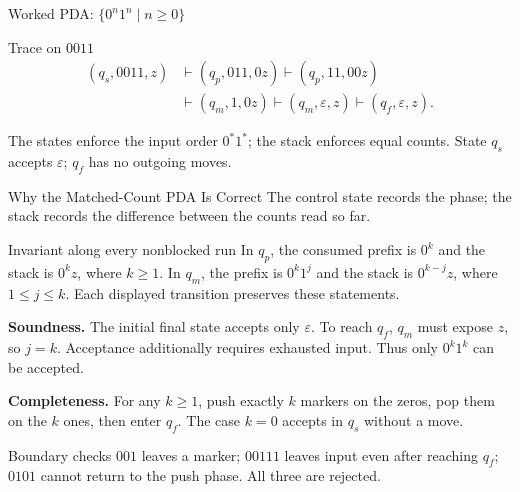 \documentclass[10pt]{beamer}
\begin{document}
\begin{frame}{Worked PDA: $\{0^n1^n\mid n\ge0\}$}
  \begin{center}
  \end{center}
  \pause
  \begin{exampleblock}{Trace on $0011$}
    \[
    \begin{aligned}
      (q_s,0011,z)&\vdash(q_p,011,0z)
      \vdash(q_p,11,00z)\\
      &\vdash(q_m,1,0z)
      \vdash(q_m,\varepsilon,z)
      \vdash(q_f,\varepsilon,z).
    \end{aligned}
    \]
  \end{exampleblock}
  The states enforce the input order $0^*1^*$; the stack enforces equal counts.
  State $q_s$ accepts $\varepsilon$; $q_f$ has no outgoing moves.
\end{frame}

\begin{frame}{Why the Matched-Count PDA Is Correct}
  \small
  The control state records the phase; the stack records the difference
  between the counts read so far.
  \begin{block}{Invariant along every nonblocked run}
    In $q_p$, the consumed prefix is $0^k$ and the stack is $0^kz$,
    where $k\ge1$. In $q_m$, the prefix is $0^k1^j$ and the stack is
    $0^{k-j}z$, where $1\le j\le k$.
    Each displayed transition preserves these statements.
  \end{block}
  \pause
  \textbf{Soundness.} The initial final state accepts only $\varepsilon$.
  To reach $q_f$, $q_m$ must expose $z$, so $j=k$. Acceptance additionally
  requires exhausted input. Thus only $0^k1^k$ can be accepted.
  \pause
  \par\smallskip
  \textbf{Completeness.} For any $k\ge1$, push exactly $k$ markers on the
  zeros, pop them on the $k$ ones, then enter $q_f$. The case $k=0$ accepts
  in $q_s$ without a move.
  \begin{exampleblock}{Boundary checks}
    $001$ leaves a marker; $00111$ leaves input even after reaching $q_f$;
    $0101$ cannot return to the push phase. All three are rejected.
  \end{exampleblock}
\end{frame}
\end{document}
